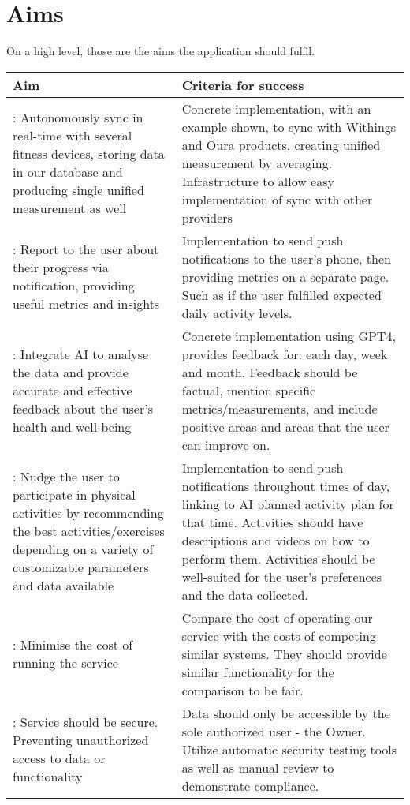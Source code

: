 \section{Aims}
On a high level, those are the aims the application should fulfil.
\begin{center}
    \begin{tabularx}{1\textwidth} {| >{\centering\arraybackslash}X 
        | >{\centering\arraybackslash}X 
        |}
    \hline
    Aim & Criteria for success  \\ 
    \hline
     1: Autonomously sync in real-time with several fitness devices, storing data in our database and producing single unified measurement as well & Concrete implementation, with an example shown, to sync with Withings and Oura products, creating unified measurement by averaging.  Infrastructure to allow easy implementation of sync with other providers\\ 
    \hline
     2: Report to the user about their progress via notification, providing useful metrics and insights & Implementation to send push notifications to the user's phone, then providing metrics on a separate page. Such as if the user fulfilled expected daily activity levels. \\ 
    \hline
     3: Integrate AI to analyse the data and provide accurate and effective feedback about the user's health and well-being & Concrete implementation using GPT4, provides feedback for: each day, week and month. Feedback should be factual, mention specific metrics/measurements, and include positive areas and areas that the user can improve on.\\
    \hline
     4: Nudge the user to participate in physical activities by recommending the best activities/exercises depending on a variety of customizable parameters and data available & Implementation to send push notifications throughout times of day, linking to AI planned activity plan for that time. Activities should have descriptions and videos on how to perform them. Activities should be well-suited for the user's preferences and the data collected.\\
    \hline
     5: Minimise the cost of running the service & Compare the cost of operating our service with the costs of competing similar systems. They should provide similar functionality for the comparison to be fair. \\
    \hline
     6: Service should be secure. Preventing unauthorized access to data or functionality & Data should only be accessible by the sole authorized user - the Owner. Utilize automatic security testing tools as well as manual review to demonstrate compliance.\\

\end{tabularx}
\end{center}
